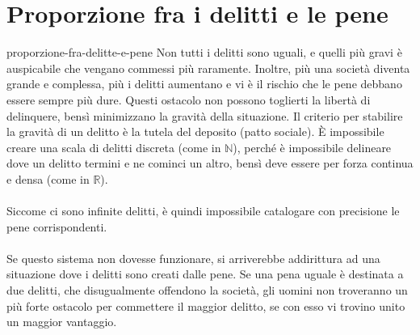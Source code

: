 \documentclass[preview]{standalone}
\begin{document}
\genpage

\section{Proporzione fra i delitti e le pene}

\begin{snippet}{proporzione-fra-delitte-e-pene}
    Non tutti i delitti sono uguali, e quelli più gravi è auspicabile che vengano
    commessi più raramente.
    Inoltre, più una società diventa grande e complessa, più i delitti aumentano
    e vi è il rischio che le pene debbano essere sempre più dure.
    Questi ostacolo non possono toglierti la libertà di delinquere, bensì minimizzano la
    gravità della situazione.
    Il criterio per stabilire la gravità di un delitto è la tutela del deposito (patto sociale).
    È impossibile creare una scala di delitti discreta (come in \(\mathbb{N}\)),
    perché è impossibile delineare dove un delitto termini e ne cominci un altro,
    bensì deve essere per forza continua e densa (come in \(\mathbb{R}\)).
    \\\\
    Siccome ci sono infinite delitti, è quindi impossibile catalogare
    con precisione le pene corrispondenti.
    \\\\
    Se questo sistema non dovesse funzionare, si arriverebbe addirittura ad una situazione
    dove i delitti sono creati dalle pene.
    Se una pena uguale è destinata a due delitti, che disugualmente offendono la società, gli
    uomini non troveranno un più forte ostacolo per commettere il
    maggior delitto, se con esso vi trovino unito un maggior vantaggio.
\end{snippet}
\end{document}
